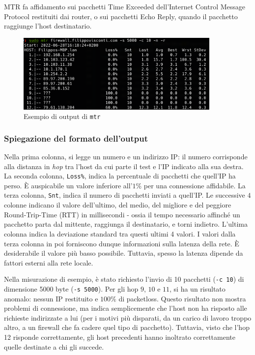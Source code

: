 MTR fa affidamento sui pacchetti Time Exceeded dell'Internet Control Message Protocol restituiti dai router, o sui pacchetti Echo Reply, quando il pacchetto raggiunge l'host destinatario.

\begin{figure}[ht]
    \centering
    \includegraphics[width=10cm]{figure/mtrSample.png}
    \caption{Esempio di output di \texttt{mtr}}
\end{figure}

\subsubsection{Spiegazione del formato dell'output}
Nella prima colonna, si legge un numero e un indirizzo IP: il numero corrisponde alla distanza in \emph{hop} tra l'host da cui parte il test e l'IP indicato alla sua destra.
La seconda colonna, \texttt{Loss\%}, indica la percentuale di pacchetti che quell'IP ha perso. È auspicabile un valore inferiore all'$1$\% per una connessione affidabile.
La terza colonna, \texttt{Snt}, indica il numero di pacchetti inviati a quell'IP.
Le successive $4$ colonne indicano il valore dell'ultimo, del medio, del migliore e del peggiore Round-Trip-Time (RTT) in millisecondi - ossia il tempo necessario affinché un pacchetto parta dal mittente, raggiunga il destinatario, e torni indietro.
L'ultima colonna indica la deviazione standard tra questi ultimi 4 valori.
I valori dalla terza colonna in poi forniscono dunque informazioni sulla latenza della rete. È desiderabile il valore più basso possibile. Tuttavia,  spesso la latenza dipende da fattori esterni alla rete locale.

Nella misurazione di esempio, è stato richiesto l'invio di 10 pacchetti (\texttt{-c 10}) di dimensione 5000 byte (\texttt{-s 5000}).
Per gli hop $9$, $10$ e $11$, si ha un risultato anomalo: nessun IP restituito e $100$\% di packetloss.
Questo risultato non mostra problemi di connessione, ma indica semplicemente che l'host non ha risposto alle richieste indirizzate a lui (per i motivi più disparati, da un carico di lavoro troppo altro, a un firewall che fa cadere quel tipo di pacchetto). Tuttavia, visto che l'hop 12 risponde correttamente, gli host precedenti hanno inoltrato correttamente quelle destinate a chi gli succede.

